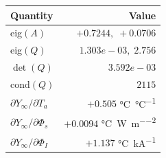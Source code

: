\begin{tabular}{l r}
\toprule
Quantity & Value \\
\midrule
eig$(A)$                           & $+0.7244,\; +0.0706$ \\
eig$(Q)$                           & $1.303e-03,\; 2.756$ \\
$\det(Q)$                          & $3.592e-03$ \\
$\mathrm{cond}(Q)$               & $2115$ \\
$\partial Y_\infty/\partial T_a$   & $+0.505$ \si{\celsius\per\celsius} \\
$\partial Y_\infty/\partial \Phi_s$ & $+0.0094$ \si{\celsius\per\watt\per\meter\squared} \\
$\partial Y_\infty/\partial \Phi_I$ & $+1.137$ \si{\celsius\per\kilo\ampere} \\
\bottomrule
\end{tabular}